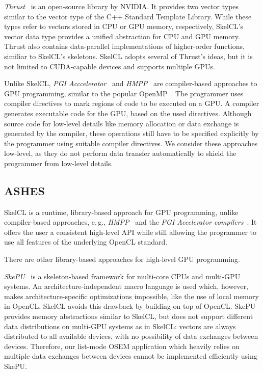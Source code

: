 \emph{Thrust}~\cite{HoB-09a} is an open-source library by NVIDIA.
It provides two vector types similar to the vector type of the C++ Standard Template Library.
While these types refer to vectors stored in CPU or GPU memory, respectively, SkelCL's vector data type provides a unified abstraction for CPU and GPU memory.
Thrust also contains data-parallel implementations of higher-order functions, similiar to SkelCL's skeletons.
SkelCL adopts several of Thrust's ideas, but it is not limited to CUDA-capable devices and supports multiple GPUs.

Unlike SkelCL, \emph{PGI Acccelerator}~\cite{PGI-10} and \emph{HMPP}~\cite{HMPP-09} are compiler-based approaches to GPU programming, similar to the popular OpenMP~\cite{OpenMP-08}.
The programmer uses compiler directives to mark regions of code to be executed on a GPU.
A compiler generates executable code for the GPU, based on the used directives.
Although source code for low-level details like memory allocation or data exchange is generated by the compiler, these operations still have to be specified explicitly by the programmer using suitable compiler directives.
We consider these approaches low-level, as they do not perform data transfer automatically to shield the programmer from low-level details.

\subsection{ASHES}
SkelCL is a runtime, library-based approach for GPU programming, unlike compiler-based approaches, e.\,g., \emph{HMPP}~\cite{HMPP-07} and the \emph{PGI Accelerator compilers}~\cite{PGI-10}.
It offers the user a consistent high-level API while still allowing the programmer to use all features of the underlying OpenCL standard.

There are other library-based approaches for high-level GPU programming.

\emph{SkePU}~\cite{EnK-10} is a skeleton-based framework for multi-core CPUs and multi-GPU systems.
An architecture-independent macro language is used which, however, makes architecture-specific optimizations impossible, like the use of local memory in OpenCL.
SkelCL avoids this drawback by building on top of OpenCL.
SkePU provides memory abstractions similar to SkelCL, but does not support different data distributions on multi-GPU systems as in SkelCL:
vectors are always distributed to all available devices, with no possibility of data exchanges between devices.
Therefore, our list-mode OSEM application which heavily relies on multiple data exchanges between devices cannot be implemented efficiently using SkePU.

